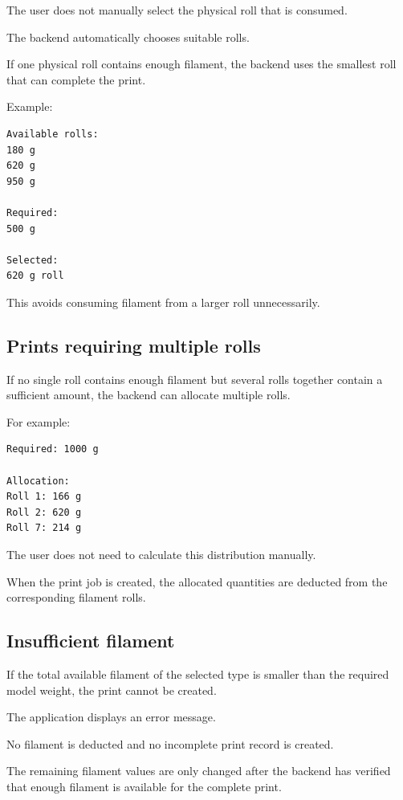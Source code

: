 \documentclass[a4paper,11pt]{article}
\begin{document}
The user does not manually select the physical roll that is consumed.

The backend automatically chooses suitable rolls.

If one physical roll contains enough filament, the backend uses the smallest
roll that can complete the print.

Example:

\begin{lstlisting}
Available rolls:
180 g
620 g
950 g

Required:
500 g

Selected:
620 g roll
\end{lstlisting}

This avoids consuming filament from a larger roll unnecessarily.

\subsection{Prints requiring multiple rolls}

If no single roll contains enough filament but several rolls together contain
a sufficient amount, the backend can allocate multiple rolls.

For example:

\begin{lstlisting}
Required: 1000 g

Allocation:
Roll 1: 166 g
Roll 2: 620 g
Roll 7: 214 g
\end{lstlisting}

The user does not need to calculate this distribution manually.

When the print job is created, the allocated quantities are deducted from the
corresponding filament rolls.

\subsection{Insufficient filament}

If the total available filament of the selected type is smaller than the
required model weight, the print cannot be created.

The application displays an error message.

No filament is deducted and no incomplete print record is created.

\begin{infobox}
The remaining filament values are only changed after the backend has verified
that enough filament is available for the complete print.
\end{infobox}
\end{document}
